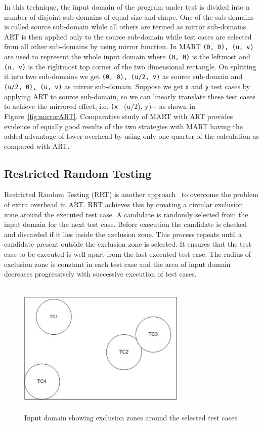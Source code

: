 In this technique, the input domain of the program under test is divided into n number of disjoint sub-domains of equal size and shape. One of the sub-domains is called source sub-domain while all others are termed as mirror sub-domains. ART is then applied only to the source sub-domain while test cases are selected from all other sub-domains by using mirror function. In MART \verb+(0, 0), (u, v)+ are used to represent the whole input domain where \verb+(0, 0)+ is the leftmost and \verb+(u, v)+ is the rightmost top corner of the two dimensional rectangle. On splitting it into two sub-domains we get \verb+(0, 0), (u/2, v)+ as source sub-domain and \verb+(u/2, 0), (u, v)+ as mirror sub-domain. Suppose we get \verb+x+ and \verb+y+ test cases by applying ART to source sub-domain, so we can linearly translate these test cases to achieve the mirrored effect, i.e. \verb+(x + (u/2), y)+ as shown in Figure~\ref{fig:mirrorART}. Comparative study of MART with ART provides evidence of equally good results of the two strategies with MART having the added advantage of lower overhead by using only one quarter of the calculation as compared with ART.


\subsection{Restricted Random Testing}
Restricted Random Testing (RRT) is another approach~\cite{chan2003normalized} to overcome the problem of extra overhead in ART. RRT achieves this by creating a circular exclusion zone around the executed test case. A candidate is randomly selected from the input domain for the next test case. Before execution the candidate is checked and discarded if it lies inside the exclusion zone. This process repeats until a candidate present outside the exclusion zone is selected. It ensures that the test case to be executed is well apart from the last executed test case. The radius of exclusion zone is constant in each test case and the area of input domain decreases progressively with successive execution of test cases.

\begin{figure}[h]
	\centering
	\includegraphics[width= 8cm, height = 6.5cm]{chapter2/RRT.pdf}
	\caption{Input domain showing exclusion zones around the selected test cases}
\end{figure}

